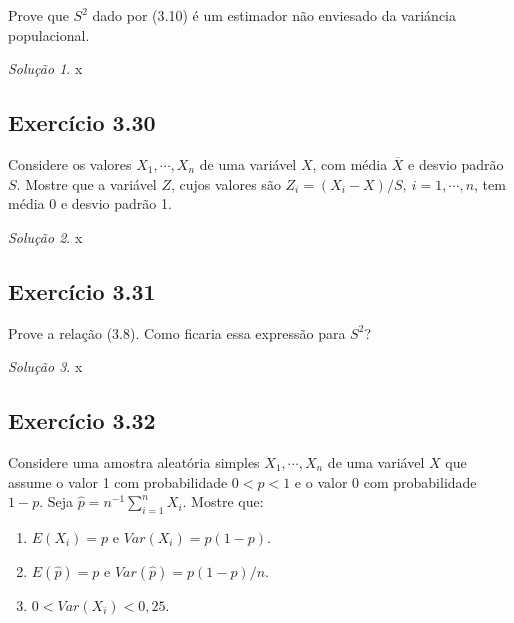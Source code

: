 \documentclass[
]{latex/krantz}
\providecommand{\tightlist}{%
  \setlength{\itemsep}{0pt}\setlength{\parskip}{0pt}}
\theoremstyle{definition}
\theoremstyle{definition}
\theoremstyle{definition}
\theoremstyle{definition}
\theoremstyle{remark}
\newtheorem*{solution}{Solução}
\begin{document}
Prove que \(S^{2}\) dado por (3.10) é um estimador não enviesado da variáncia populacional.

\begin{solution}
x
\end{solution}

\hypertarget{exr3-30}{%
\subsection*{Exercício 3.30}\label{exr3-30}}

Considere os valores \(X_{1}, \cdots , X_{n}\) de uma variável \(X\), com média \(\overline{X}\) e desvio padrão \(S\). Mostre que a variável \(Z\), cujos valores são \(Z_{i} = (X_{i} - X) / S, \ i = 1, \cdots , n\), tem média 0 e desvio padrão 1.

\begin{solution}
x
\end{solution}

\hypertarget{exr3-31}{%
\subsection*{Exercício 3.31}\label{exr3-31}}

Prove a relação (3.8). Como ficaria essa expressão para \(S^{2}\)?

\begin{solution}
x
\end{solution}

\hypertarget{exr3-32}{%
\subsection*{Exercício 3.32}\label{exr3-32}}

Considere uma amostra aleatória simples \(X_{1}, \cdots , X_{n}\) de uma variável \(X\) que assume o valor 1 com probabilidade \(0 < p < 1\) e o valor 0 com probabilidade \(1 - p\). Seja \(\hat{p} = n^{-1} \sum_{i=1}^{n} X_{i}\). Mostre que:

\begin{enumerate}
\def\labelenumi{\roman{enumi})}
\tightlist
\item
  \(E(X_{i}) = p\) e \(Var(X_{i}) = p (1 - p)\).
\item
  \(E(\hat{p}) = p\) e \(Var(\hat{p}) = p (1 - p) / n\).
\item
  \(0 < Var(X_{i}) < 0,25\).
\end{enumerate}
\end{document}
